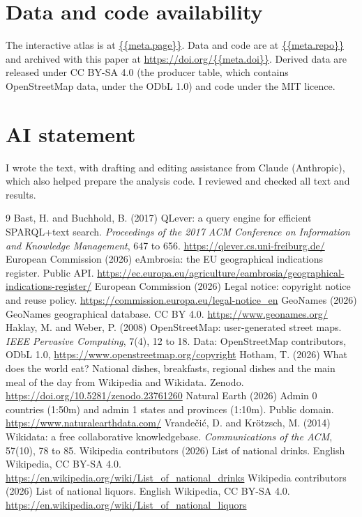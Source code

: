 \documentclass[11pt,a4paper]{article}
\begin{document}
\section*{Data and code availability}
The interactive atlas is at \url{{{meta.page}}}. Data and code are at \url{{{meta.repo}}} and archived with this paper at \url{https://doi.org/{{meta.doi}}}. Derived data are released under CC BY-SA 4.0 (the producer table, which contains OpenStreetMap data, under the ODbL 1.0) and code under the MIT licence.

\section*{AI statement}
I wrote the text, with drafting and editing assistance from Claude (Anthropic), which also helped prepare the analysis code. I reviewed and checked all text and results.

\begin{thebibliography}{9}
 Bast, H. and Buchhold, B. (2017) QLever: a query engine for efficient SPARQL+text search. \emph{Proceedings of the 2017 ACM Conference on Information and Knowledge Management}, 647 to 656. \url{https://qlever.cs.uni-freiburg.de/}
 European Commission (2026) eAmbrosia: the EU geographical indications register. Public API. \url{https://ec.europa.eu/agriculture/eambrosia/geographical-indications-register/}
 European Commission (2026) Legal notice: copyright notice and reuse policy. \url{https://commission.europa.eu/legal-notice_en}
 GeoNames (2026) GeoNames geographical database. CC BY 4.0. \url{https://www.geonames.org/}
 Haklay, M. and Weber, P. (2008) OpenStreetMap: user-generated street maps. \emph{IEEE Pervasive Computing}, 7(4), 12 to 18. Data: OpenStreetMap contributors, ODbL 1.0, \url{https://www.openstreetmap.org/copyright}
 Hotham, T. (2026) What does the world eat? National dishes, breakfasts, regional dishes and the main meal of the day from Wikipedia and Wikidata. Zenodo. \url{https://doi.org/10.5281/zenodo.23761260}
 Natural Earth (2026) Admin 0 countries (1:50m) and admin 1 states and provinces (1:10m). Public domain. \url{https://www.naturalearthdata.com/}
 Vrandečić, D. and Krötzsch, M. (2014) Wikidata: a free collaborative knowledgebase. \emph{Communications of the ACM}, 57(10), 78 to 85.
 Wikipedia contributors (2026) List of national drinks. English Wikipedia, CC BY-SA 4.0. \url{https://en.wikipedia.org/wiki/List_of_national_drinks}
 Wikipedia contributors (2026) List of national liquors. English Wikipedia, CC BY-SA 4.0. \url{https://en.wikipedia.org/wiki/List_of_national_liquors}
\end{thebibliography}
\end{document}
